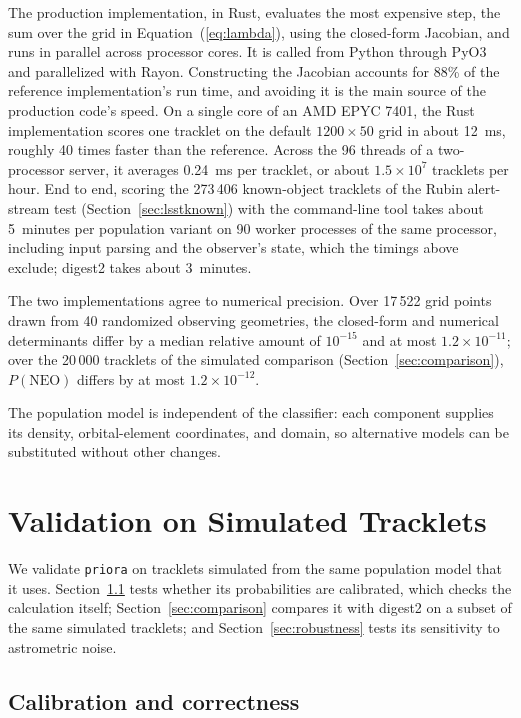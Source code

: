 \documentclass[linenumbers,twocolumn]{aastex701}
\newcommand{\priora}{{\tt priora}\xspace} %
\begin{document}
The production implementation, in Rust, evaluates the most expensive step,
the sum over the grid in Equation~(\ref{eq:lambda}), using the closed-form
Jacobian, and runs in parallel across processor cores. It is called from
Python through PyO3 and parallelized with Rayon. 
Constructing the Jacobian accounts for 88\% of the reference
implementation's run time, and avoiding it is the main source of the
production code's speed. On a single core of an AMD EPYC 7401, the Rust
implementation scores one tracklet on the default $1200\times50$ grid in
about 12~ms, roughly 40 times faster than the reference. Across the 96
threads of a two-processor server, it averages 0.24~ms per tracklet, or
about $1.5\times10^{7}$ tracklets per hour. End to end, scoring the
273\,406 known-object tracklets of the Rubin alert-stream test
(Section~\ref{sec:lsstknown}) with the command-line tool takes about
5~minutes per population variant on 90 worker processes of the same
processor, including input parsing and the observer's state, which the
timings above exclude; digest2 takes about 3~minutes.

The two implementations agree to numerical precision. Over 17\,522 grid points drawn from
40 randomized observing geometries, the closed-form and numerical
determinants differ by a median relative amount of $10^{-15}$ and at most
$1.2\times10^{-11}$; over the 20\,000 tracklets of the simulated comparison
(Section~\ref{sec:comparison}), $P(\mathrm{NEO})$ differs by at most
$1.2\times10^{-12}$.

The population model is independent of the classifier: each component
supplies its density, orbital-element coordinates, and domain, so alternative
models can be substituted without other changes.



\section{Validation on Simulated Tracklets}
\label{sec:validation}

We validate \priora on tracklets simulated from the same population model
that it uses. Section~\ref{sec:selfconsistency} tests whether its
probabilities are calibrated, which checks the calculation itself;
Section~\ref{sec:comparison} compares it with digest2 on a subset of the
same simulated tracklets; and Section~\ref{sec:robustness} tests its
sensitivity to astrometric noise.

\subsection{Calibration and correctness}
\label{sec:selfconsistency}
\end{document}
